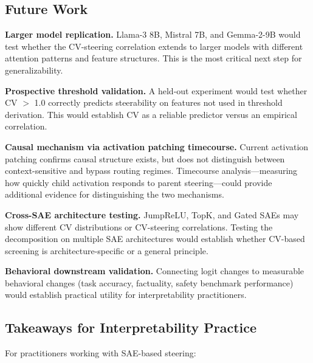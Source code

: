 \documentclass{article}
\begin{document}
\subsection{Future Work}

\textbf{Larger model replication.} Llama-3 8B, Mistral 7B, and Gemma-2-9B would test whether the CV-steering correlation extends to larger models with different attention patterns and feature structures. This is the most critical next step for generalizability.

\textbf{Prospective threshold validation.} A held-out experiment would test whether CV $>$ 1.0 correctly predicts steerability on features not used in threshold derivation. This would establish CV as a reliable predictor versus an empirical correlation.

\textbf{Causal mechanism via activation patching timecourse.} Current activation patching confirms causal structure exists, but does not distinguish between context-sensitive and bypass routing regimes. Timecourse analysis---measuring how quickly child activation responds to parent steering---could provide additional evidence for distinguishing the two mechanisms.

\textbf{Cross-SAE architecture testing.} JumpReLU, TopK, and Gated SAEs may show different CV distributions or CV-steering correlations. Testing the decomposition on multiple SAE architectures would establish whether CV-based screening is architecture-specific or a general principle.

\textbf{Behavioral downstream validation.} Connecting logit changes to measurable behavioral changes (task accuracy, factuality, safety benchmark performance) would establish practical utility for interpretability practitioners.

\subsection{Takeaways for Interpretability Practice}

For practitioners working with SAE-based steering:
\end{document}
